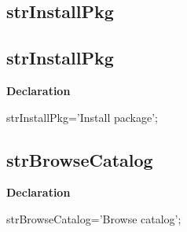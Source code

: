 \documentclass{report}
\newif\ifpdf
\begin{document}
\subsection*{\large{\textbf{strInstallPkg}}\normalsize\hspace{1ex}\hrulefill}
\else
\subsection*{strInstallPkg}
\fi
\label{trstrings-strInstallPkg}
\begin{list}{}{
\setlength{\itemindent}{0cm}
\setlength{\listparindent}{0cm}
\setlength{\leftmargin}{\evensidemargin}
\addtolength{\leftmargin}{\tmplength}
\settowidth{\labelsep}{X}
\addtolength{\leftmargin}{\labelsep}
\setlength{\labelwidth}{\tmplength}
}
\item[\textbf{Declaration}\hfill]
\ifpdf
\begin{flushleft}
\fi
\begin{ttfamily}
strInstallPkg='Install package';\end{ttfamily}

\ifpdf
\end{flushleft}
\fi

\end{list}
\ifpdf
\subsection*{\large{\textbf{strBrowseCatalog}}\normalsize\hspace{1ex}\hrulefill}
\else
\subsection*{strBrowseCatalog}
\fi
\label{trstrings-strBrowseCatalog}
\begin{list}{}{
\setlength{\itemindent}{0cm}
\setlength{\listparindent}{0cm}
\setlength{\leftmargin}{\evensidemargin}
\addtolength{\leftmargin}{\tmplength}
\settowidth{\labelsep}{X}
\addtolength{\leftmargin}{\labelsep}
\setlength{\labelwidth}{\tmplength}
}
\item[\textbf{Declaration}\hfill]
\ifpdf
\begin{flushleft}
\fi
\begin{ttfamily}
strBrowseCatalog='Browse catalog';\end{ttfamily}

\ifpdf
\end{flushleft}
\fi

\end{list}
\ifpdf
\end{document}
